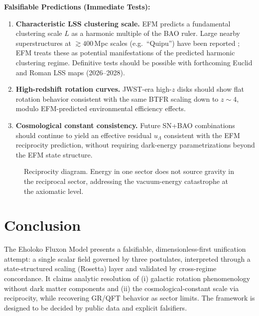 \documentclass[11pt, twoside]{article}
\begin{document}
\textbf{Falsifiable Predictions (Immediate Tests):}
\begin{enumerate}[leftmargin=*]
\item \textbf{Characteristic LSS clustering scale.} EFM predicts a fundamental clustering scale $L$ as a harmonic multiple of the BAO ruler. Large nearby superstructures at $\gtrsim 400$\,Mpc scales (e.g.\ ``Quipu'') have been reported \citep{bohringer2025quipu}; EFM treats these as potential manifestations of the predicted harmonic clustering regime. Definitive tests should be possible with forthcoming Euclid and Roman LSS maps (2026--2028).
\item \textbf{High-redshift rotation curves.} JWST-era high-$z$ disks should show flat rotation behavior consistent with the same BTFR scaling down to $z\sim 4$, modulo EFM-predicted environmental efficiency effects.
\item \textbf{Cosmological constant consistency.} Future SN+BAO combinations should continue to yield an effective residual $u_\Lambda$ consistent with the EFM reciprocity prediction, without requiring dark-energy parametrizations beyond the EFM state structure.
\end{enumerate}

\begin{figure}[H]
\centering
{}
\caption{Reciprocity diagram. Energy in one sector does not source gravity in the reciprocal sector, addressing the vacuum-energy catastrophe at the axiomatic level.}
\label{fig:reciprocity}
\end{figure}

\section{Conclusion}
The Eholoko Fluxon Model presents a falsifiable, dimensionless-first unification attempt: a single scalar field governed by three postulates, interpreted through a state-structured scaling (Rosetta) layer and validated by cross-regime concordance. It claims analytic resolution of (i) galactic rotation phenomenology without dark matter components and (ii) the cosmological-constant scale via reciprocity, while recovering GR/QFT behavior as sector limits. The framework is designed to be decided by public data and explicit falsifiers.
\end{document}
